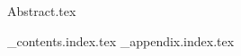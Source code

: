 \documentclass[openright, twoside]{report}
\begin{document}
  \begin{titlepage}
    \centering
    \vspace*{2cm}
    \titleblock [2cm]
    \vspace{1cm}  %
    \authorblock
    \vfill  %
    \location \\
    \dateblock \\
    \footnotesize { \texttt{\fullversion} }
  \end{titlepage}

  \attributionpage

  {Abstract.tex}

  \newpage
  \tableofcontents
  \newpage

  {_contents.index.tex}
  {_appendix.index.tex}

  \nocite{*}  
  \printbibliography
\end{document}
